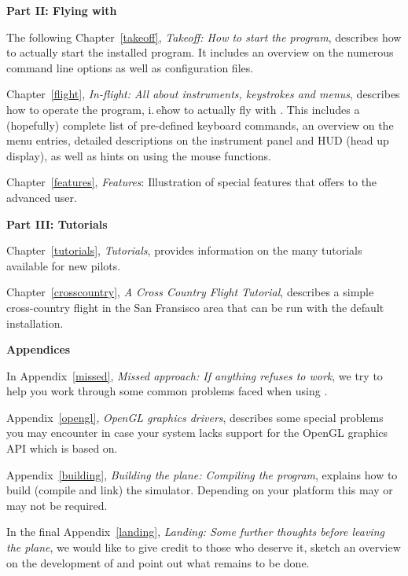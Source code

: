 \noindent
\textbf{Part II: Flying with \FlightGear{}}
\medskip

 \noindent
  The following Chapter~\ref{takeoff}, \textit{Takeoff: How to start
  the program}, describes how to actually start the installed program.
  It includes an overview on the numerous command line options as well
  as configuration files.
 \medskip

 \noindent
  Chapter~\ref{flight}, \textit{In-flight: All about instruments,
  keystrokes and menus}, describes how to operate the program, i.\,e\.
  how to actually fly with \FlightGear{}\hspace{-1mm}. This includes a
  (hopefully) complete list of pre-defined keyboard commands, an
  overview on the menu entries, detailed descriptions on the instrument
  panel and HUD (head up display), as well as hints on using the mouse
  functions.
 \medskip

 \noindent
  Chapter~\ref{features}, \textit{Features}: Illustration of special
  features that \FlightGear{} offers to the advanced user.
 \medskip

\noindent
\textbf{Part III: Tutorials}
\medskip

 \noindent
 Chapter~\ref{tutorials}, \textit{Tutorials},
provides information on the many tutorials available for new pilots.
 \medskip

 \noindent
 Chapter~\ref{crosscountry}, \textit{A Cross Country Flight Tutorial},
describes a simple cross-country flight in the San Fransisco area that can be run with the default installation.
 \medskip

\noindent
\textbf{Appendices}
\medskip

 \noindent
  In Appendix~\ref{missed}, \textit{Missed approach: If anything refuses to work},
   we try to help you work through some common problems faced when using \FlightGear{}.
 \bigskip

 \noindent
Appendix~\ref{opengl}, \textit{OpenGL graphics drivers}, describes some special problems you may encounter in case your system lacks support for the OpenGL graphics API  which \FlightGear{} is based on. 
 \medskip

 \noindent
 Appendix~\ref{building}, \textit{Building the plane: Compiling the program},
explains how to build (compile and link) the simulator. Depending on your platform this
may or may not be required. 
 \medskip

 \noindent
  In the final Appendix~\ref{landing}, \textit{Landing: Some further thoughts before leaving the plane}, we would like to give credit to those who deserve it, sketch an overview
on the development of \FlightGear and point out what remains to be done.
 \medskip

